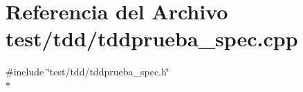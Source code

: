 \section{Referencia del Archivo test/tdd/tddprueba\+\_\+spec.cpp}
\label{tddprueba__spec_8cpp}
{\ttfamily \#include \char`\"{}test/tdd/tddprueba\+\_\+spec.\+h\char`\"{}}\\*
